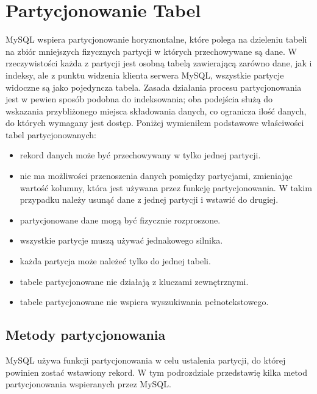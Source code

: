 \section{Partycjonowanie Tabel}
MySQL wspiera partycjonowanie horyznontalne, które polega na dzieleniu tabeli na zbiór mniejszych fizycznych partycji w których przechowywane są dane. W rzeczywistości każda z partycji jest osobną tabelą zawierającą zarówno dane, jak i indeksy, ale z punktu widzenia klienta serwera MySQL, wszystkie partycje widoczne są jako pojedyncza tabela. Zasada działania procesu partycjonowania jest w pewien sposób podobna do indeksowania; oba podejścia służą do wskazania przybliżonego miejsca składowania danych, co ogranicza ilość danych, do których wymagany jest dostęp.
Poniżej wymieniłem podstawowe właściwości tabel partycjonowanych:
\begin{itemize}
	\item rekord danych może być przechowywany w tylko jednej partycji.
	\item nie ma możliwości przenoszenia danych pomiędzy partycjami, zmieniając wartość kolumny, która jest używana przez funkcję partycjonowania. W takim przypadku należy usunąć dane z jednej partycji i wstawić do drugiej.
	\item partycjonowane dane mogą być fizycznie rozproszone.
	\item wszystkie partycje muszą używać jednakowego silnika.
	\item każda partycja może należeć tylko do jednej tabeli.
	\item tabele partycjonowane nie działają z kluczami zewnętrznymi.
	\item tabele partycjonowane nie wspiera wyszukiwania pełnotekstowego.
\end{itemize} 

\subsection{Metody partycjonowania}
MySQL używa funkcji partycjonowania w celu ustalenia partycji, do której powinien zostać wstawiony rekord. W tym podrozdziale przedstawię kilka metod partycjonowania wspieranych przez MySQL.

